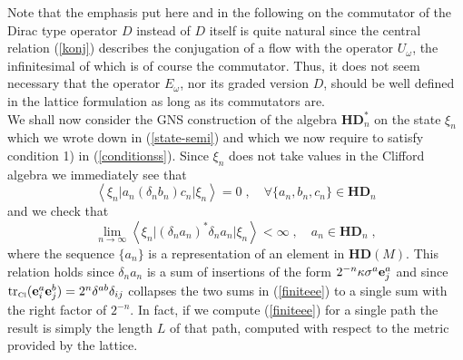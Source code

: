 \documentclass[12pt]{article}
\def\d{\delta}
\def\oo{\omega}
\def\x{\xi}
\newcommand{\tr}{\mbox{tr}}
\begin{document}
Note that the emphasis put here and in the following on the commutator of the Dirac type operator $D$ instead of $D$ itself is quite natural since the central relation (\ref{konj}) describes the conjugation of a flow with the operator $U_\oo$, the infinitesimal of which is of course the commutator. Thus, it does not seem necessary that the operator $E_\oo$, nor its graded version $D$, should be well defined in the lattice formulation as long as its commutators are.\\




We shall now consider the GNS construction of the algebra $\mathbf{HD}^*_n$ on the state $\x_n$ which we wrote down in (\ref{state-semi}) and which we now require to satisfy condition 1) in (\ref{conditionss}). Since $\x_n$ does not take values in the Clifford algebra we immediately see that 
$$
\left\langle \xi_{n} \vert a_n (\d_n b_n) c_n \vert \xi_{n}\right\rangle = 0 \;,\quad \forall \{a_n, b_n, c_n\}\in \mathbf{HD}_n
$$
and we check that
\begin{equation}
\lim_{n\rightarrow\infty}\left\langle \xi_{n} \vert  (\d_n a_n)^* \d_n a_n \vert \xi_{n}\right\rangle < \infty \;,\quad  a_n\in \mathbf{HD}_n\;,
\label{finiteee}
\end{equation}
where the sequence $\{a_n\}$ is a representation of an element in $\mathbf{HD}(M)$. This relation holds since $\d_n a_n$ is a sum of insertions of the form $2^{-n} \kappa \sigma^a  {\bf e}^a_j  $ and since $\tr_{\mbox{\tiny Cl}} ({\bf e}^a_i {\bf e}^b_j )= 2^n \d^{ab}\d_{ij}$ collapses the two sums in (\ref{finiteee}) to a single sum with the right factor of $2^{-n}$. In fact, if we compute (\ref{finiteee}) for a single path the result is simply the length $L$ of that path, computed with respect to the metric provided by the lattice.
\end{document}
